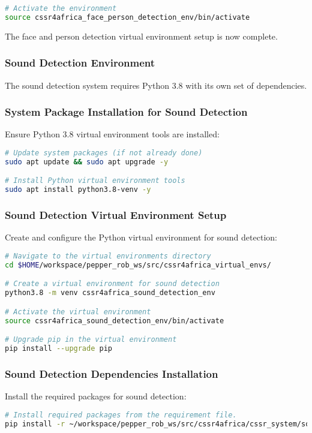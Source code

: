 \documentclass{CSSRforAfrica}
\begin{document}
{\begin{lstlisting}[style=withoutNumbering, language=bash]
# Activate the environment
source cssr4africa_face_person_detection_env/bin/activate
\end{lstlisting}

The face and person detection virtual environment setup is now complete.

\subsubsection*{Sound Detection Environment}
The sound detection system requires Python 3.8 with its own set of dependencies.

\subsubsection*{System Package Installation for Sound Detection}
Ensure Python 3.8 virtual environment tools are installed:
\begin{lstlisting}[style=withoutNumbering, language=bash]
# Update system packages (if not already done)
sudo apt update && sudo apt upgrade -y

# Install Python virtual environment tools
sudo apt install python3.8-venv -y
\end{lstlisting}

\subsubsection*{Sound Detection Virtual Environment Setup}
Create and configure the Python virtual environment for sound detection:
\begin{lstlisting}[style=withoutNumbering, language=bash]
# Navigate to the virtual environments directory
cd $HOME/workspace/pepper_rob_ws/src/cssr4africa_virtual_envs/

# Create a virtual environment for sound detection
python3.8 -m venv cssr4africa_sound_detection_env

# Activate the virtual environment
source cssr4africa_sound_detection_env/bin/activate

# Upgrade pip in the virtual environment
pip install --upgrade pip
\end{lstlisting}

\subsubsection*{Sound Detection Dependencies Installation}
Install the required packages for sound detection:
\begin{lstlisting}[style=withoutNumbering, language=bash]
# Install required packages from the requirement file.
pip install -r ~/workspace/pepper_rob_ws/src/cssr4africa/cssr_system/sound_detection/sound_detection_requirements.txt
\end{lstlisting}

}
\end{document}
